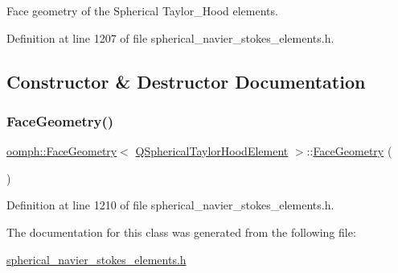 Face geometry of the Spherical Taylor\+\_\+\+Hood elements. 

Definition at line 1207 of file spherical\+\_\+navier\+\_\+stokes\+\_\+elements.\+h.



\subsection{Constructor \& Destructor Documentation}
\mbox{\label{classoomph_1_1FaceGeometry_3_01QSphericalTaylorHoodElement_01_4_ace78b3c8f3f172c81767f5b386783da2}} 
\subsubsection{\texorpdfstring{Face\+Geometry()}{FaceGeometry()}}
{\footnotesize\ttfamily \hyperlink{classoomph_1_1FaceGeometry}{oomph\+::\+Face\+Geometry}$<$ \hyperlink{classoomph_1_1QSphericalTaylorHoodElement}{Q\+Spherical\+Taylor\+Hood\+Element} $>$\+::\hyperlink{classoomph_1_1FaceGeometry}{Face\+Geometry} (\begin{DoxyParamCaption}{ }\end{DoxyParamCaption})\hspace{0.3cm}{\ttfamily [inline]}}



Definition at line 1210 of file spherical\+\_\+navier\+\_\+stokes\+\_\+elements.\+h.



The documentation for this class was generated from the following file\+:\begin{DoxyCompactItemize}
\item 
\hyperlink{spherical__navier__stokes__elements_8h}{spherical\+\_\+navier\+\_\+stokes\+\_\+elements.\+h}\end{DoxyCompactItemize}
